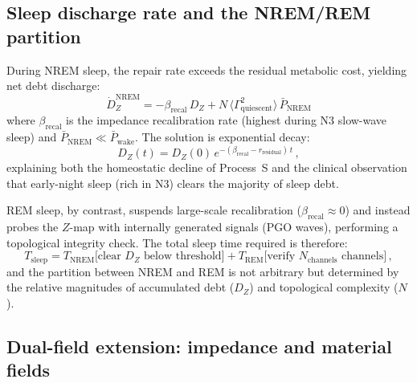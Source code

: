 ﻿\documentclass[aps,pre,twocolumn,superscriptaddress,floatfix]{revtex4-2}
\begin{document}
\subsection{Sleep discharge rate and the NREM/REM partition}

During NREM sleep, the repair rate exceeds the residual
metabolic cost, yielding net debt discharge:
\begin{equation}
  \dot{D}_Z^{\mathrm{NREM}}
    = - \beta_{\mathrm{recal}}\, D_Z
    + N\,\langle\Gamma_{\mathrm{quiescent}}^2\rangle\,
      \bar{P}_{\mathrm{NREM}}
  \label{eq:NREM-discharge}
\end{equation}
where $\beta_{\mathrm{recal}}$ is the impedance
recalibration rate (highest during N3 slow-wave sleep)
and $\bar{P}_{\mathrm{NREM}} \ll \bar{P}_{\mathrm{wake}}$.
The solution is exponential decay:
\begin{equation}
  D_Z(t) = D_Z(0)\,
    e^{-(\beta_{\mathrm{recal}} - r_{\mathrm{residual}})\,t}\,,
  \label{eq:DZ-decay}
\end{equation}
explaining both the homeostatic decline of Process~S
and the clinical observation that early-night sleep
(rich in N3) clears the majority of sleep debt.

REM sleep, by contrast, suspends large-scale recalibration
($\beta_{\mathrm{recal}} \approx 0$) and instead
probes the $Z$-map with internally generated signals
(PGO waves), performing a topological integrity check.
The total sleep time required is therefore:
\begin{equation}
  T_{\mathrm{sleep}} = T_{\mathrm{NREM}}
    \bigl[\text{clear } D_Z \text{ below threshold}\bigr]
    + T_{\mathrm{REM}}
    \bigl[\text{verify } N_{\mathrm{channels}} \text{ channels}\bigr]\,,
  \label{eq:Tsleep}
\end{equation}
and the partition between NREM and REM is not arbitrary
but determined by the relative magnitudes of accumulated
debt ($D_Z$) and topological complexity ($N$).


\subsection{Dual-field extension: impedance and material fields}
\label{sec:dual-field}
\end{document}
